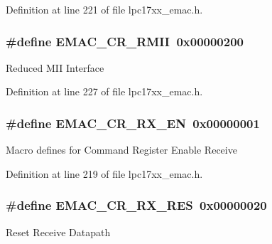 \-Definition at line 221 of file lpc17xx\-\_\-emac.\-h.

\hypertarget{group___e_m_a_c___private___macros_gaa385434bf367fbb86480da4682b49152}{
\subsubsection[{\-E\-M\-A\-C\-\_\-\-C\-R\-\_\-\-R\-M\-I\-I}]{\setlength{\rightskip}{0pt plus 5cm}\#define {\bf \-E\-M\-A\-C\-\_\-\-C\-R\-\_\-\-R\-M\-I\-I}~0x00000200}}\label{group___e_m_a_c___private___macros_gaa385434bf367fbb86480da4682b49152}
\-Reduced \-M\-I\-I \-Interface 

\-Definition at line 227 of file lpc17xx\-\_\-emac.\-h.

\hypertarget{group___e_m_a_c___private___macros_gaf8cc86b979d7a2ec7650c2b49743db83}{
\subsubsection[{\-E\-M\-A\-C\-\_\-\-C\-R\-\_\-\-R\-X\-\_\-\-E\-N}]{\setlength{\rightskip}{0pt plus 5cm}\#define {\bf \-E\-M\-A\-C\-\_\-\-C\-R\-\_\-\-R\-X\-\_\-\-E\-N}~0x00000001}}\label{group___e_m_a_c___private___macros_gaf8cc86b979d7a2ec7650c2b49743db83}
\-Macro defines for \-Command \-Register \-Enable \-Receive 

\-Definition at line 219 of file lpc17xx\-\_\-emac.\-h.

\hypertarget{group___e_m_a_c___private___macros_ga82c0b530953c72d5c0c1b4313fbee9d5}{
\subsubsection[{\-E\-M\-A\-C\-\_\-\-C\-R\-\_\-\-R\-X\-\_\-\-R\-E\-S}]{\setlength{\rightskip}{0pt plus 5cm}\#define {\bf \-E\-M\-A\-C\-\_\-\-C\-R\-\_\-\-R\-X\-\_\-\-R\-E\-S}~0x00000020}}\label{group___e_m_a_c___private___macros_ga82c0b530953c72d5c0c1b4313fbee9d5}
\-Reset \-Receive \-Datapath 

